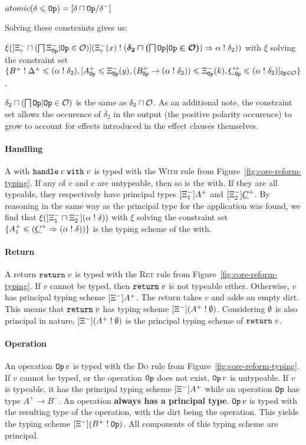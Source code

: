 $atomic(\delta \le \op) = [\delta \intersection \op / \delta^-]$

Solving these constraints gives us:

$\xi([\ctxm^-_r \intersection (\bigsqcap \ctxm^-_\op | \op \in \ops)](\ctxm_r^-(x) \E (\bm{\delta_2 \intersection (\bigsqcap \op | \op \in \ops)}) \hto \alpha \E \delta_2))$ with $\xi$ solving the constraint set $\{B^+ \E \dirt^+ \le (\alpha \E \delta_2), [A^+_\op \le \ctxm_\op^-(y), (B^+_\op \to (\alpha \E \delta_2)) \le \ctxm_\op^-(k), \C^+_\op \le (\alpha \E \delta_2)]_{\op \in \ops}\}$.

$\delta_2 \intersection (\bigsqcap \op | \op \in \ops)$ is the same as $\delta_2 \intersection \ops$. As an additional note, the constraint set allows the occurence of $\delta_2$ in the output (the positive polarity occurence) to grow to account for effects introduced in the effect clauses themselves.

\paragraph{Handling} A with $\withhandle{v}{c}$ is typed with the \textsc{With} rule from Figure~\ref{fig:core-reform-typing}. If any of $v$ and $c$ are untypeable, then so is the with. If they are all typeable, they respectively have principal types $[\ctxm^-_1]A^+$ and $[\ctxm^-_2]\C^+$. By reasoning in the same way as the principal type for the application was found, we find that $\xi([\ctxm^-_1 \intersection \ctxm^-_2](\alpha \E \delta))$ with $\xi$ solving the constraint set $\{A^+_1 \le  (\C^+ \hto (\alpha \E \delta))\}$ is the typing scheme of the with.

\paragraph{Return} A return $\ret v$ is typed with the \textsc{Ret} rule from Figure~\ref{fig:core-reform-typing}. If $v$ cannot be typed, then $\ret v$ is not typeable either. Otherwise, $v$ has principal typing scheme $[\ctxm^-]A^+$. The return takes $v$ and adds an empty dirt. This means that $\ret v$ has typing scheme $[\ctxm^-](A^+ \E \emptyrow)$. Considering $\emptyrow$ is also principal in nature, $[\ctxm^-](A^+ \E \emptyrow)$ is the principal typing scheme of $\ret v$.

\paragraph{Operation} An operation $\op \, v$ is typed with the \textsc{Do} rule from Figure~\ref{fig:core-reform-typing}. If $v$ cannot be typed, or the operation $\op$ does not exist, $\op \, v$ is untypeable. If $v$ is typeable, it has the principal typing scheme $[\ctxm^-]A^+$ while an operation $\op$ has type $A^+ \to B^-$. An operation \textbf{always has a principal type}. $\op \, v$ is typed with the resulting type of the operation, with the dirt being the operation. This yields the typing scheme $[\ctxm^-](B^+ \E \op)$. All components of this typing scheme are principal.

